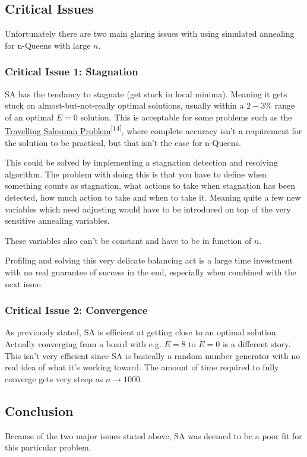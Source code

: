 \documentclass{article}
\begin{document}
\subsection{Critical Issues}
Unfortunately there are two main glaring issues with using simulated annealing for n-Queens with large \(n\).

\subsubsection{Critical Issue 1: Stagnation}
SA has the tendancy to stagnate (get stuck in local minima). Meaning it gets stuck on almost-but-not-really optimal solutions,
usually within a \(2-3\%\) range of an optimal \(E = 0\) solution.
This is acceptable for some problems such as the \href{https://en.wikipedia.org/wiki/Travelling_salesman_problem}{Travelling Salesman Problem}\textsuperscript{[14]},
where complete accuracy isn't a requirement for the solution to be practical, but that isn't the case for n-Queens.

This could be solved by implementing a stagnation detection and resolving algorithm.
The problem with doing this is that you have to define when something counts as stagnation,
what actions to take when stagnation has been detected, how much action to take and when to take it.
Meaning quite a few new variables which need adjusting would have to be introduced on top of the very sensitive annealing variables.

These variables also can't be constant and have to be in function of \(n\).

Profiling and solving this very delicate balancing act is a large time investment with no real guarantee of success in the end,
especially when combined with the next issue.

\subsubsection{Critical Issue 2: Convergence}
As previously stated, SA is efficient at getting close to an optimal solution.
Actually converging from a board with e.g. \(E=8\) to \(E=0\) is a different story.
This isn't very efficient since SA is basically a random number generator with no real idea of what it's working toward.
The amount of time required to fully converge gets very steep as \(n \to 1000\).

\subsection{Conclusion}
Because of the two major issues stated above, SA was deemed to be a poor fit for this particular problem.
\end{document}
